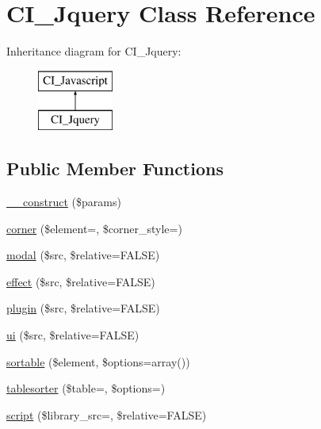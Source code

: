 \hypertarget{class_c_i___jquery}{}\section{C\+I\+\_\+\+Jquery Class Reference}
\label{class_c_i___jquery}
Inheritance diagram for C\+I\+\_\+\+Jquery\+:\begin{figure}[H]
\begin{center}
\leavevmode
\includegraphics[height=2.000000cm]{class_c_i___jquery}
\end{center}
\end{figure}
\subsection*{Public Member Functions}
\begin{DoxyCompactItemize}
\item 
\mbox{\hyperlink{class_c_i___jquery_a9162320adff1a1a4afd7f2372f753a3e}{\+\_\+\+\_\+construct}} (\$params)
\item 
\mbox{\hyperlink{class_c_i___jquery_a79fc5ec6312aa89cd06e47c864e37ff1}{corner}} (\$element=\textquotesingle{}\textquotesingle{}, \$corner\+\_\+style=\textquotesingle{}\textquotesingle{})
\item 
\mbox{\hyperlink{class_c_i___jquery_a951696f5f5092fee0d2aba1f8602b419}{modal}} (\$src, \$relative=F\+A\+L\+SE)
\item 
\mbox{\hyperlink{class_c_i___jquery_a42898d255de9b25100e042825a1c4633}{effect}} (\$src, \$relative=F\+A\+L\+SE)
\item 
\mbox{\hyperlink{class_c_i___jquery_a25a0d7f0c18dac193aa2c67908c85c89}{plugin}} (\$src, \$relative=F\+A\+L\+SE)
\item 
\mbox{\hyperlink{class_c_i___jquery_ad2d6d964ed10597e0223f883c553cf0c}{ui}} (\$src, \$relative=F\+A\+L\+SE)
\item 
\mbox{\hyperlink{class_c_i___jquery_afb2aa7347e6ff89ab0177478a7f3869d}{sortable}} (\$element, \$options=array())
\item 
\mbox{\hyperlink{class_c_i___jquery_a088079669b8389ceb97efea5381caf62}{tablesorter}} (\$table=\textquotesingle{}\textquotesingle{}, \$options=\textquotesingle{}\textquotesingle{})
\item 
\mbox{\hyperlink{class_c_i___jquery_a4ebe6b0267c1a82bec52f1ffbc10ef8d}{script}} (\$library\+\_\+src=\textquotesingle{}\textquotesingle{}, \$relative=F\+A\+L\+SE)
\end{DoxyCompactItemize}
